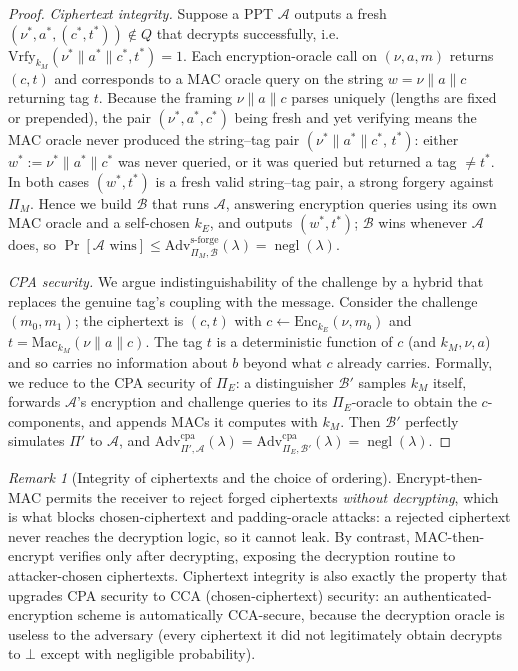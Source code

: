 \documentclass[11pt,a4paper]{article}
\theoremstyle{definition}
\theoremstyle{remark}
\newtheorem{remark}[theorem]{Remark}
\DeclareMathOperator{\negl}{negl}
\begin{document}
\begin{proof}
\emph{Ciphertext integrity.} Suppose a PPT \(\mathcal{A}\) outputs a fresh \((\nu^\ast, a^\ast, (c^\ast, t^\ast)) \notin Q\) that decrypts successfully, i.e. \(\mathrm{Vrfy}_{k_M}(\nu^\ast\|a^\ast\|c^\ast, t^\ast) = 1\). Each encryption-oracle call on \((\nu, a, m)\) returns \((c, t)\) and corresponds to a MAC oracle query on the string \(w = \nu\|a\|c\) returning tag \(t\). Because the framing \(\nu\|a\|c\) parses uniquely (lengths are fixed or prepended), the pair \((\nu^\ast,a^\ast,c^\ast)\) being fresh and yet verifying means the MAC oracle never produced the string--tag pair \((\nu^\ast\|a^\ast\|c^\ast,\, t^\ast)\): either \(w^\ast := \nu^\ast\|a^\ast\|c^\ast\) was never queried, or it was queried but returned a tag \(\ne t^\ast\). In both cases \((w^\ast, t^\ast)\) is a fresh valid string--tag pair, a strong forgery against \(\Pi_M\). Hence we build \(\mathcal{B}\) that runs \(\mathcal{A}\), answering encryption queries using its own MAC oracle and a self-chosen \(k_E\), and outputs \((w^\ast, t^\ast)\); \(\mathcal{B}\) wins whenever \(\mathcal{A}\) does, so \(\Pr[\mathcal{A}\text{ wins}] \le \mathrm{Adv}^{\mathrm{s\text{-}forge}}_{\Pi_M,\mathcal{B}}(\lambda) = \negl(\lambda)\).

\emph{CPA security.} We argue indistinguishability of the challenge by a hybrid that replaces the genuine tag's coupling with the message. Consider the challenge \((m_0, m_1)\); the ciphertext is \((c, t)\) with \(c \leftarrow \mathrm{Enc}_{k_E}(\nu, m_b)\) and \(t = \mathrm{Mac}_{k_M}(\nu\|a\|c)\). The tag \(t\) is a deterministic function of \(c\) (and \(k_M, \nu, a\)) and so carries no information about \(b\) beyond what \(c\) already carries. Formally, we reduce to the CPA security of \(\Pi_E\): a distinguisher \(\mathcal{B}'\) samples \(k_M\) itself, forwards \(\mathcal{A}\)'s encryption and challenge queries to its \(\Pi_E\)-oracle to obtain the \(c\)-components, and appends MACs it computes with \(k_M\). Then \(\mathcal{B}'\) perfectly simulates \(\Pi'\) to \(\mathcal{A}\), and \(\mathrm{Adv}^{\mathrm{cpa}}_{\Pi',\mathcal{A}}(\lambda) = \mathrm{Adv}^{\mathrm{cpa}}_{\Pi_E,\mathcal{B}'}(\lambda) = \negl(\lambda)\).
\end{proof}

\begin{remark}[Integrity of ciphertexts and the choice of ordering]\label{symmetric:rem-etm}
Encrypt-then-MAC permits the receiver to reject forged ciphertexts \emph{without decrypting}, which is what blocks chosen-ciphertext and padding-oracle attacks: a rejected ciphertext never reaches the decryption logic, so it cannot leak. By contrast, MAC-then-encrypt verifies only after decrypting, exposing the decryption routine to attacker-chosen ciphertexts. Ciphertext integrity is also exactly the property that upgrades CPA security to CCA (chosen-ciphertext) security: an authenticated-encryption scheme is automatically CCA-secure, because the decryption oracle is useless to the adversary (every ciphertext it did not legitimately obtain decrypts to \(\bot\) except with negligible probability).
\end{remark}
\end{document}
